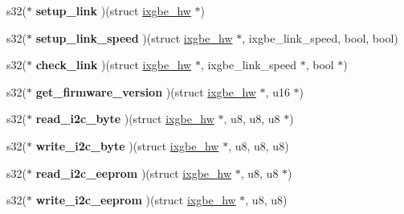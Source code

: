 \begin{DoxyCompactItemize}
\item 
\hypertarget{structixgbe__phy__operations_a0179d5d7f7ede439cc1fa701001bc7d0}{
s32($\ast$ {\bfseries setup\_\-link} )(struct \hyperlink{structixgbe__hw}{ixgbe\_\-hw} $\ast$)}
\label{structixgbe__phy__operations_a0179d5d7f7ede439cc1fa701001bc7d0}

\item 
\hypertarget{structixgbe__phy__operations_ae65919eae8667f29b33ad5e9fe440aa0}{
s32($\ast$ {\bfseries setup\_\-link\_\-speed} )(struct \hyperlink{structixgbe__hw}{ixgbe\_\-hw} $\ast$, ixgbe\_\-link\_\-speed, bool, bool)}
\label{structixgbe__phy__operations_ae65919eae8667f29b33ad5e9fe440aa0}

\item 
\hypertarget{structixgbe__phy__operations_ad76dae700ad85d91ee8b0d2cbf5c58f7}{
s32($\ast$ {\bfseries check\_\-link} )(struct \hyperlink{structixgbe__hw}{ixgbe\_\-hw} $\ast$, ixgbe\_\-link\_\-speed $\ast$, bool $\ast$)}
\label{structixgbe__phy__operations_ad76dae700ad85d91ee8b0d2cbf5c58f7}

\item 
\hypertarget{structixgbe__phy__operations_aa28416ef0d2cc80f2c0668d66a44b110}{
s32($\ast$ {\bfseries get\_\-firmware\_\-version} )(struct \hyperlink{structixgbe__hw}{ixgbe\_\-hw} $\ast$, u16 $\ast$)}
\label{structixgbe__phy__operations_aa28416ef0d2cc80f2c0668d66a44b110}

\item 
\hypertarget{structixgbe__phy__operations_a4cf3b53e6564bf90a542994ea4987116}{
s32($\ast$ {\bfseries read\_\-i2c\_\-byte} )(struct \hyperlink{structixgbe__hw}{ixgbe\_\-hw} $\ast$, u8, u8, u8 $\ast$)}
\label{structixgbe__phy__operations_a4cf3b53e6564bf90a542994ea4987116}

\item 
\hypertarget{structixgbe__phy__operations_a8f5426b7f361b015980e6ffb32cf8e4d}{
s32($\ast$ {\bfseries write\_\-i2c\_\-byte} )(struct \hyperlink{structixgbe__hw}{ixgbe\_\-hw} $\ast$, u8, u8, u8)}
\label{structixgbe__phy__operations_a8f5426b7f361b015980e6ffb32cf8e4d}

\item 
\hypertarget{structixgbe__phy__operations_a758c377fe1c1ff423c30bc1c3425fb2e}{
s32($\ast$ {\bfseries read\_\-i2c\_\-eeprom} )(struct \hyperlink{structixgbe__hw}{ixgbe\_\-hw} $\ast$, u8, u8 $\ast$)}
\label{structixgbe__phy__operations_a758c377fe1c1ff423c30bc1c3425fb2e}

\item 
\hypertarget{structixgbe__phy__operations_a3f7e688cfc73c6f3518f682253cbcccc}{
s32($\ast$ {\bfseries write\_\-i2c\_\-eeprom} )(struct \hyperlink{structixgbe__hw}{ixgbe\_\-hw} $\ast$, u8, u8)}
\label{structixgbe__phy__operations_a3f7e688cfc73c6f3518f682253cbcccc}


\end{DoxyCompactItemize}

